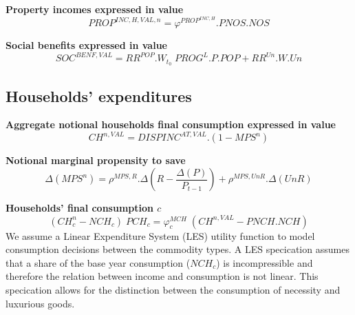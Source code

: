 \documentclass[12pt]{article}
\numberwithin{equation}{section}
\begin{document}
\noindent \textbf{Property incomes expressed in value} 
\begin{dmath}
PROP^{INC,H,VAL,n} = \varphi^{PROP^{INC,H}} . PNOS . NOS
\label{consumer.mdlPROP_INC_H_VAL_n}
\end{dmath}

\noindent \textbf{Social benefits expressed in value} 
\begin{dmath}
SOC^{BENF,VAL} = RR^{POP} . W_{t_0} \; PROG^{L} . P . POP + RR^{Un} . W . Un
\label{consumer.mdlSOC_BENF_VAL}
\end{dmath}











\subsection{Households' expenditures}



\noindent \textbf{Aggregate notional households final consumption expressed in value} 
\begin{dmath}
CH^{n,VAL} = DISPINC^{AT,VAL} . \left( 1 - MPS^{n} \right)
\label{consumer.mdlCH_n_VAL}
\end{dmath}

\noindent \textbf{Notional marginal propensity to save} 
\begin{dmath}
\varDelta \left(MPS^{n}\right) = \rho^{MPS,R} . \varDelta \left(R - \frac{\varDelta \left(P\right)}{P_{t-1}}\right) + \rho^{MPS,UnR} . \varDelta \left(UnR\right)
\label{consumer.mdlMPS_n}
\end{dmath}





\noindent \textbf{Households' final consumption $c$} 
\begin{dmath}
\left( CH^{n}_{c} - NCH_{c} \right) \; PCH_{c} = \varphi^{MCH}_{c} \; \left( CH^{n,VAL} - PNCH . NCH \right)
\label{consumer.mdlCH_n[c]}
\end{dmath}
We assume a Linear Expenditure System (LES) utility function to model consumption decisions between the commodity types. A LES specication assumes that a share of the base year consumption ($NCH_{c}$) is incompressible and therefore the relation between income and consumption is not linear. This specication allows for the distinction between the consumption of necessity and luxurious goods. \\
\end{document}
